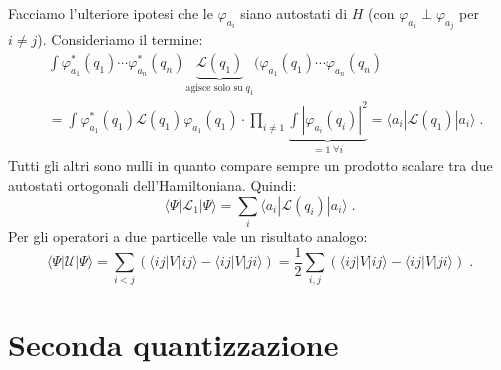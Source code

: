 \documentclass[10pt,a4paper]{report}
\theoremstyle{definition}
\newcommand{\lag}{\mathcal{L}}
\numberwithin{equation}{section}
\newcommand{\bra}{\langle}
\newcommand{\ket}{\rangle}
\begin{document}
Facciamo l'ulteriore ipotesi che le $\varphi_{a_i}$ siano autostati di $H$ (con $\varphi_{a_i}\perp\varphi_{a_j}$ per $i\ne j$). Consideriamo il termine:
\begin{align*}
&\int \varphi_{a_1}^*(q_1)\cdots\varphi_{a_n}^*(q_n)\underbrace{\lag(q_1)}_{\mbox{agisce solo su}\; q_1}(\varphi_{a_1}(q_1)\cdots\varphi_{a_n}(q_n) \\
&= \int \varphi_{a_1}^*(q_1)\lag(q_1)\varphi_{a_1}(q_1)\cdot\prod_{i\ne 1}\underbrace{\int|\varphi_{a_i}(q_i)|^2}_{=1\;\forall i}=\bra a_i|\lag(q_1)|a_i\ket\;.
\end{align*}
Tutti gli altri sono nulli in quanto compare sempre un prodotto scalare tra due autostati ortogonali dell'Hamiltoniana. Quindi:
\begin{equation}
\bra\Psi|\lag_1|\Psi\ket=\sum_i\bra a_i|\lag(q_i)|a_i\ket\;.
\end{equation}
Per gli operatori a due particelle vale un risultato analogo:
\begin{equation}
\bra\Psi|\mathcal{U}|\Psi\ket=\sum_{i<j}(\bra ij|V|ij\ket-\bra ij|V|ji\ket)=\frac{1}{2}\sum_{i,j}(\bra ij|V|ij\ket-\bra ij|V|ji\ket)\;.
\end{equation}
\chapter{Seconda quantizzazione}
\end{document}
